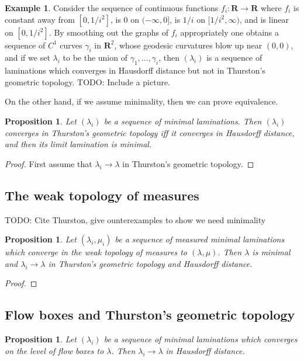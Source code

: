 \documentclass[reqno,10pt]{amsart}
\newcommand{\RR}{\mathbf{R}}
\newtheorem{proposition}[theorem]{Proposition}
\theoremstyle{definition}
\newtheorem{example}[theorem]{Example}
\numberwithin{equation}{section}
\begin{document}
\begin{example}\label{Hausdorff does not imply Thurston}
Consider the sequence of continuous functions $f_i: \RR \to \RR$ where $f_i$ is constant away from $[0, 1/i^2]$, is $0$ on $(-\infty, 0]$, is $1/i$ on $[1/i^2, \infty)$, and is linear on $[0, 1/i^2]$.
By smoothing out the graphs of $f_i$ appropriately one obtains a sequence of $C^1$ curves $\gamma_i$ in $\RR^2$, whose geodesic curvatures blow up near $(0, 0)$, and if we set $\lambda_i$ to be the union of $\gamma_1, \dots, \gamma_i$, then $(\lambda_i)$ is a sequence of laminations which converges in Hausdorff distance but not in Thurston's geometric topology.
TODO: Include a picture.
\end{example}

On the other hand, if we assume minimality, then we can prove equivalence.

\begin{proposition}
Let $(\lambda_i)$ be a sequence of minimal laminations.
Then $(\lambda_i)$ converges in Thurston's geometric topology iff it converges in Hausdorff distance, and then its limit lamination is minimal.
\end{proposition}
\begin{proof}
First assume that $\lambda_i \to \lambda$ in Thurston's geometric topology.

\end{proof}



\subsection{The weak topology of measures}
TODO: Cite Thurston, give ounterexamples to show we need minimality

\begin{proposition}
Let $(\lambda_i, \mu_i)$ be a sequence of measured minimal laminations which converge in the weak topology of measures to $(\lambda, \mu)$.
Then $\lambda$ is minimal and $\lambda_i \to \lambda$ in Thurston's geometric topology and Hausdorff distance.
\end{proposition}
\begin{proof}

\end{proof}


\subsection{Flow boxes and Thurston's geometric topology}
\begin{proposition}
Let $(\lambda_i)$ be a sequence of minimal laminations which converges on the level of flow boxes to $\lambda$.
Then $\lambda_i \to \lambda$ in Hausdorff distance. 
\end{proposition}
\end{document}
